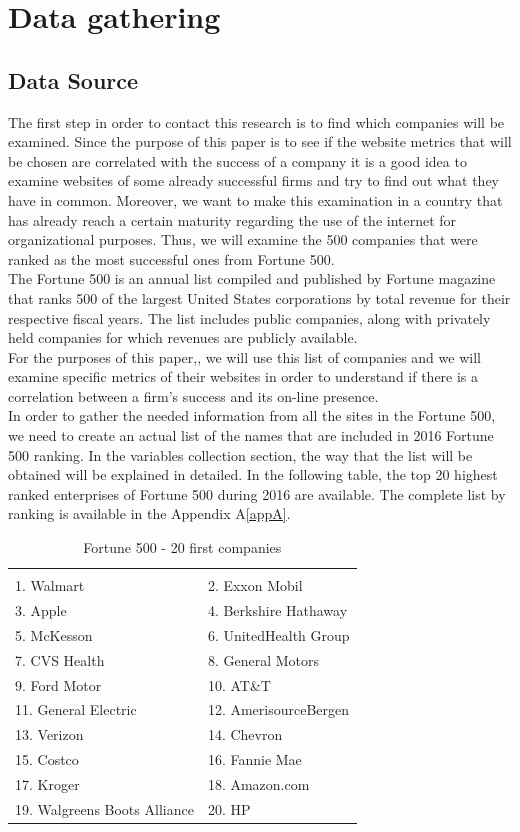\documentclass{book}
\begin{document}
\chapter{Data gathering}

\section{Data Source}\label{ds:f500}
The first step in order to contact this research is to find which companies will be examined. Since the purpose of this paper is to see if the website metrics that will be chosen are correlated with the success of a company it is a good idea to examine websites of some already successful firms and try to find out what they have in common. Moreover, we want to make this examination in a country that has already reach a certain maturity regarding the use of the internet for organizational purposes. Thus, we will examine the 500 companies that were ranked as the most successful ones from Fortune 500.\\
The Fortune 500 is an annual list compiled and published by Fortune magazine that ranks 500 of the largest United States corporations by total revenue for their respective fiscal years. The list includes public companies, along with privately held companies for which revenues are publicly available.\cite{key1, key2}\\
For the purposes of this paper,, we will use this list of companies and we will examine specific metrics of their websites in order to understand if there is a correlation between a firm's success and its on-line presence.\\
In order to gather the needed information from all the sites in the Fortune 500, we need to create an actual list of the names that are included in 2016 Fortune 500 ranking. In the variables collection section, the way that the list will be obtained will be explained in detailed. In the following table, the top 20 highest ranked enterprises of Fortune 500 during 2016 are available. The complete list by ranking is available in the Appendix A\ref{appA}.
\begin{table}[H]
\centering
\caption{Fortune 500 - 20 first companies}
\begin{tabular}{ll}
\hline
 \\ 1. Walmart 
&  2. Exxon Mobil 
\\  3. Apple 
& 4. Berkshire Hathaway 
\\  5. McKesson 
&  6. UnitedHealth Group 
\\ 7. CVS Health 
&  8. General Motors 
\\  9. Ford Motor 
& 10. AT\&T 
\\  11. General Electric 
&  12. AmerisourceBergen 
\\ 13. Verizon 
&  14. Chevron 
\\ 15. Costco 
& 16. Fannie Mae 
\\  17. Kroger 
&  18. Amazon.com 
\\ 19. Walgreens Boots Alliance 
&  20. HP 
 \\ \hline
\end{tabular}
\end{table}
\end{document}
